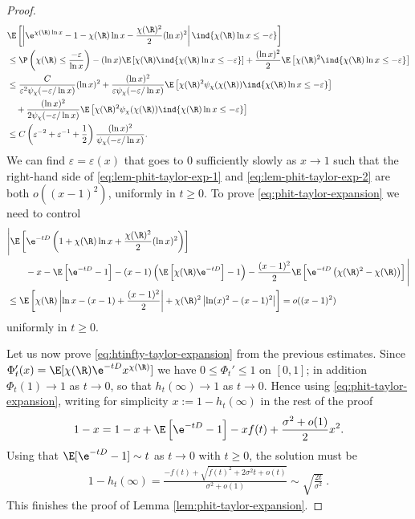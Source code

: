 \documentclass[10pt,a4paper]{article}
\begin{document}
\begin{proof}
\begin{align}
& \E\left[ \left| \e^{\chi(\R)\ln x} - 1 - \chi(\R) \ln x - \frac{\chi(\R)^2}{2} (\ln x)^2 \right| \ind{\chi(\R)\ln x \leq -\varepsilon} \right]  \nonumber \\
&\leq \P\left( \chi(\R) \leq \frac{-\varepsilon}{\ln x} \right) - (\ln x) \E\left[ \chi(\R)\ind{\chi(\R)\ln x \leq -\varepsilon} \right] + \frac{(\ln x)^2}{2} \E\left[ \chi(\R)^2 \ind{\chi(\R)\ln x \leq -\varepsilon} \right]  \nonumber \\
&\leq \frac{C}{\varepsilon^2 \psi_\chi(-\varepsilon/\ln x)} (\ln x)^2 + \frac{(\ln x)^2}{\varepsilon \psi_\chi(-\varepsilon/\ln x)} \E\left[ \chi(\R)^2 \psi_\chi(\chi(\R)) \ind{\chi(\R)\ln x \leq -\varepsilon} \right]  \nonumber \\
&\quad + \frac{(\ln x)^2}{2 \psi_\chi(-\varepsilon/\ln x)} \E\left[ \chi(\R)^2 \psi_\chi(\chi(\R)) \ind{\chi(\R)\ln x \leq -\varepsilon} \right] \nonumber \\
&\leq C\left( \varepsilon^{-2} + \varepsilon^{-1} + \frac 1 2 \right) \frac{(\ln x)^2}{\psi_\chi(-\varepsilon / \ln x)} .  \label{eq:lem-phit-taylor-exp-2}
\end{align}
We can find $\varepsilon = \varepsilon(x)$ that goes to $0$ sufficiently slowly as $x\to 1$ such that the right-hand side of \eqref{eq:lem-phit-taylor-exp-1} and \eqref{eq:lem-phit-taylor-exp-2} are both $o((x-1)^2)$, uniformly in $t\geq 0$. To prove \eqref{eq:phit-taylor-expansion} we need to control
\begin{align*}
&\Bigg| \E\left[ \e^{-tD}\left( 1 + \chi(\R) \ln x + \frac{\chi(\R)^2}{2} (\ln x)^2 \right) \right] \\
&\qquad - x - \E\left[ \e^{-tD}-1 \right] - (x-1) \left(\E\left[\chi(\R) \e^{-tD}\right]-1\right) - \frac{(x-1)^2}{2}\E\left[ \e^{-tD}\left( \chi(\R)^2 - \chi(\R)\right)\right] \Bigg| \\
&\leq \E\left[ \chi(\R) \left|\ln x - (x-1) + \frac{(x-1)^2}{2}\right| + \chi(\R)^2 \left|\ln(x)^2 - (x-1)^2\right| \right] = o((x-1)^2)
\end{align*}
uniformly in $t\geq 0$. 

Let us now prove \eqref{eq:htinfty-taylor-expansion} from the previous estimates. 
Since $\Phi_t'(x) = \E[\chi(\R) \e^{-t D} x^{\chi(\R)}]$ we have $0\leq \Phi_t'\leq 1$ on $[0,1]$; in addition $\Phi_t(1) \to 1$ as $t\to 0$, so that $h_t(\infty) \to 1$ as $t\to 0$. Hence using \eqref{eq:phit-taylor-expansion}, writing for simplicity $x := 1-h_t(\infty)$ in the rest of the proof
\begin{align*}
1-x = 1-x + \E\left[\e^{-tD}-1\right] - x f(t) + \frac{\sigma^2 + o(1)}{2} x^2 .
\end{align*}
Using that $\E[\e^{-tD}-1] \sim t$ as $t\to 0$ with $t\geq 0$, the solution must be
\begin{align*}
1-h_t(\infty) = \frac{-f(t) + \sqrt{f(t)^2 + 2 \sigma^2 t + o(t)}}{\sigma^2 + o(1)} \sim \sqrt{\frac{2 t}{\sigma^2}} \ .
\end{align*}
This finishes the proof of Lemma \ref{lem:phit-taylor-expansion}. 
\end{proof}
\end{document}
